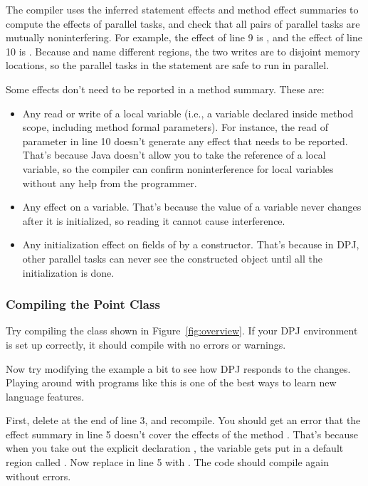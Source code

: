 The compiler uses the inferred statement effects and method effect
summaries to compute the effects of parallel tasks, and check that all
pairs of parallel tasks are mutually noninterfering.  For example, the
effect of line 9 is , and the effect of line 10 is
.  Because  and  name different regions,
the two writes are to disjoint memory locations, so the parallel tasks
in the  statement are safe to run in parallel.  

Some effects don't need to be reported in a method summary.  These
are:
%
\begin{itemize}
%
\item Any read or write of a local variable (i.e., a variable declared
  inside method scope, including method formal parameters).  For
  instance, the read of parameter  in line 10 doesn't generate
  any effect that needs to be reported.  That's because Java doesn't
  allow you to take the reference of a local variable, so the compiler
  can confirm noninterference for local variables without any help
  from the programmer.
%
\item Any effect on a  variable.  That's because the value
  of a  variable never changes after it is initialized, so
  reading it cannot cause interference.
%
\item Any initialization effect on fields of  by a
  constructor.  That's because in DPJ, other parallel tasks can never
  see the constructed object until all the initialization is done.
%
\end{itemize}

\subsubsection{Compiling the Point Class%
\label{sec:overview:basic:compiling}}

Try compiling the  class shown in
Figure~\ref{fig:overview}.  If your DPJ environment is set up
correctly, it should compile with no errors or warnings.

Now try modifying the example a bit to see how DPJ responds to the
changes.  Playing around with programs like this is one of the best
ways to learn new language features.

First, delete  at the end of line 3, and recompile.  You
should get an error that the effect summary  in line 5
doesn't cover the effects of the method .  That's because
when you take out the explicit declaration , the variable
 gets put in a default region called .  Now replace
 in line 5 with .  The code should
compile again without errors.

